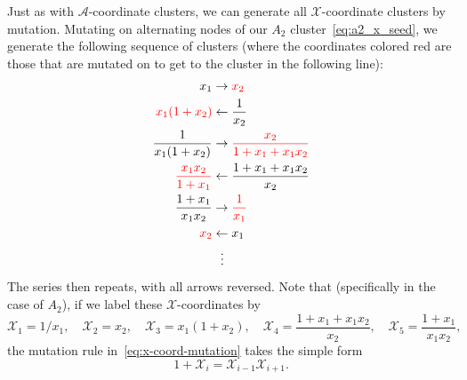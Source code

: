 \documentclass[11pt]{article}
\def\nl{\nonumber\\}
\def\nn{\nonumber}
\def\x{\mathcal{X}}
\def\a{\mathcal{A}}
\def\drawPentagon{
\coordinate (P1) at (90:1);
\coordinate (P2) at (18:1);
\coordinate (P3) at (306:1);
\coordinate (P4) at (234:1);
\coordinate (P5) at (162:1);
\draw (P1) -- (P2) -- (P3) -- (P4) -- (P5) -- cycle;
}
\begin{document}
Just as with $\a$-coordinate clusters, we can generate all $\x$-coordinate clusters by mutation. Mutating on alternating nodes of our $A_2$ cluster~\eqref{eq:a2_x_seed}, we generate the following sequence of clusters (where the coordinates colored red are those that are mutated on to get to the cluster in the following line):
\begin{align}
  x_1 &\to \color{red}{x_2} \nl
  \color{red}{x_1(1+x_2)} &\leftarrow \frac{1}{x_2} \nl
  \frac{1}{x_1(1+x_2)} &\to \color{red}{\frac{x_2}{1+x_1+x_1 x_2}} \\
  \color{red}{\frac{x_1 x_2}{1+x_1}} &\leftarrow \frac{1+x_1+x_1 x_2}{x_2} \nl
  \frac{1+x_1}{x_1 x_2} &\to \color{red}{\frac{1}{x_1}} \nl
  \color{red}{x_2} &\leftarrow x_1 \nl
  &\ \ \vdots \nn
\end{align}
The series then repeats, with all arrows reversed. Note that (specifically in the case of $A_2$), if we label these $\x$-coordinates by
\begin{equation}\label{def:a2-xcoords}
  \x_1 = 1/x_1, \quad \x_2 = x_2, \quad \x_3 = x_1(1+x_2), \quad 
  \x_4 = \frac{1+x_1+x_1 x_2}{x_2}, \quad \x_5 = \frac{1+x_1}{x_1 x_2},
\end{equation}
the mutation rule in~\eqref{eq:x-coord-mutation} takes the simple form
\begin{equation}\label{eq:exchange-relation}
  1+\x_i = \x_{i-1}\x_{i+1}.
\end{equation}
\end{document}

